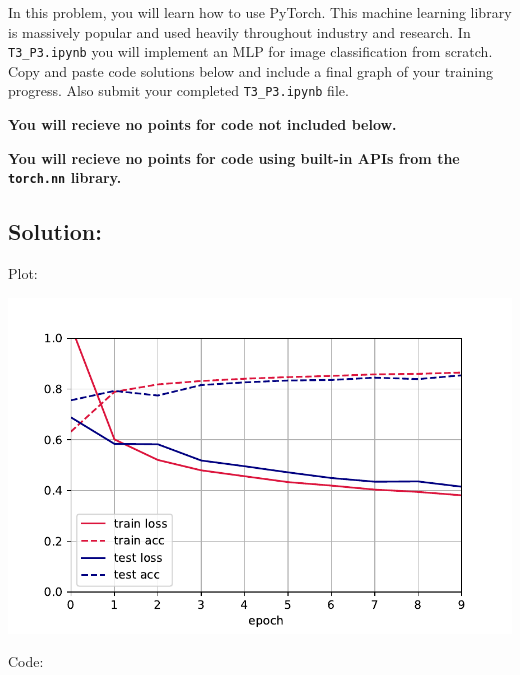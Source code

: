 \documentclass[submit]{harvardml}
\begin{document}
\newpage

\begin{problem}
  In this problem, you will learn how to use PyTorch. This machine learning library is massively popular and used heavily throughout industry and research. In \verb|T3_P3.ipynb| you will implement an MLP for image classification from scratch. Copy and paste code solutions below and include a final graph of your training progress. Also submit your completed \verb|T3_P3.ipynb| file.

  {\bfseries You will recieve no points for code not included below.}

  {\bfseries You will recieve no points for code using built-in APIs from the \verb|torch.nn| library.}
  
\end{problem}

\newpage
\subsection*{Solution:}
Plot:

\includegraphics[width=\linewidth]{final_plot}

\newpage
Code:
\end{document}
